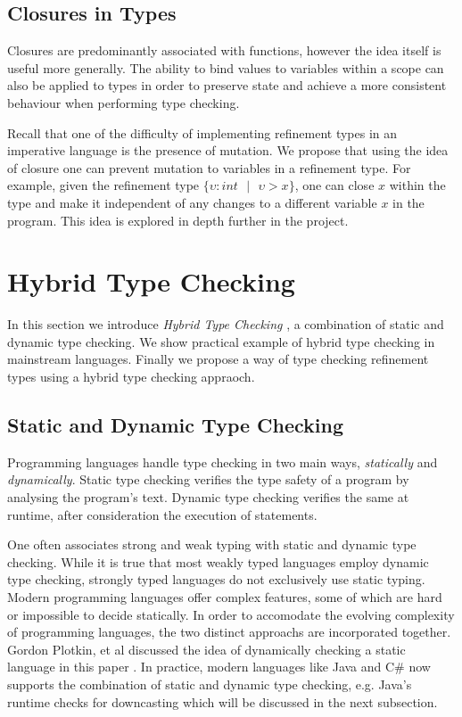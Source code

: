 \documentclass[a4paper,12pt]{report}
\begin{document}
\subsection{Closures in Types}
Closures are predominantly associated with functions, however the idea 
itself is useful more generally. The ability to bind values to variables 
within a scope can also be applied to types in order to preserve state and achieve 
a more consistent behaviour when performing type checking. 

\par
Recall that one of the difficulty of implementing refinement types in an 
imperative language is the presence of mutation. We propose that using the idea  
of closure one can prevent mutation to variables in a refinement type. For 
example, given the refinement type 
$\{\upsilon : int \text{ }|\text{ }\upsilon > x\}$, one can close $x$ within the 
type and make it independent of any changes to a different variable $x$ in the program. 
This idea is explored in depth further in the project.

\section{Hybrid Type Checking} \label{section:hybrid_type_checking}
In this section we introduce \emph{Hybrid Type Checking} \cite{hybridTypeChecking}, 
a combination of static and dynamic type checking. We show practical example 
of hybrid type checking in mainstream languages. Finally we propose a way of 
type checking refinement types using a hybrid type checking appraoch.

\subsection{Static and Dynamic Type Checking}
Programming languages handle type checking in two main ways, \textit{statically} 
and \textit{dynamically}. Static type checking verifies the type 
safety of a program by analysing the program's text. Dynamic type checking 
verifies the same at runtime, after consideration the execution of statements. 

\par
One often associates strong and weak typing with static and dynamic type 
checking. While it is true that most weakly typed languages employ dynamic  
type checking, strongly typed languages do not exclusively use static typing. 
Modern programming languages offer complex features, some of which are hard 
or impossible to decide statically. In order to accomodate the evolving 
complexity of programming languages, the two distinct approachs are 
incorporated together. Gordon Plotkin, et al discussed the 
idea of dynamically checking a static language in this paper 
\cite{dynamicCheckStaticLanguage}. In practice, modern languages like 
Java and C# now supports the combination of static and dynamic type checking, 
e.g. Java's runtime checks for downcasting which will be 
discussed in the next subsection.
\end{document}

